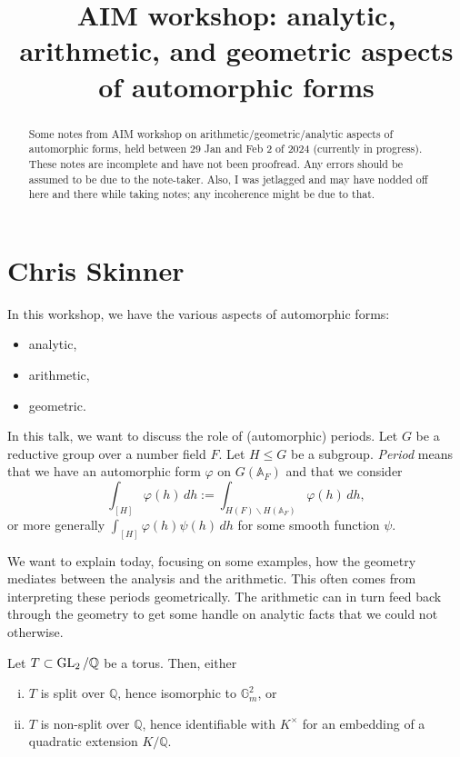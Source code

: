\documentclass[reqno]{amsart} 
\title{AIM workshop: analytic, arithmetic, and geometric aspects of automorphic forms}
\begin{document}
\begin{abstract}
  Some notes from AIM workshop on arithmetic/geometric/analytic aspects of automorphic forms, held between 29 Jan and Feb 2 of 2024 (currently in progress).  These notes are incomplete and have not been proofread.  Any errors should be assumed to be due to the note-taker.  Also, I was jetlagged and may have nodded off here and there while taking notes; any incoherence might be due to that.
\end{abstract}

\maketitle

\section{Chris Skinner}\label{sec:cnfhlpu30h}
In this workshop, we have the various aspects of automorphic forms:
\begin{itemize}
\item analytic,
\item arithmetic,
\item geometric.
\end{itemize}
In this talk, we want to discuss the role of (automorphic) periods.  Let $G$ be a reductive group over a number field $F$.  Let $H \leq G$ be a subgroup. \emph{Period} means that we have an automorphic form $\varphi$ on $G(\mathbb{A}_F)$ and that we consider
\begin{equation*}
  \int_{[H]} \varphi(h) \, d h := \int_{H(F) \backslash H(\mathbb{A}_F)} \varphi(h) \, d h,
\end{equation*}
or more generally $\int_{[H]} \varphi(h) \psi(h) \, d h$ for some smooth function $\psi$.

We want to explain today, focusing on some examples, how the geometry mediates between the analysis and the arithmetic.  This often comes from interpreting these periods geometrically.  The arithmetic can in turn feed back through the geometry to get some handle on analytic facts that we could not otherwise.

Let $T \subset \operatorname{GL}_2 / \mathbb{Q}$ be a torus.  Then, either
\begin{enumerate}[(i)]
\item\label{enumerate:cnej2gipk2} $T$ is split over $\mathbb{Q}$, hence isomorphic to $\mathbb{G}_m^2$, or
\item\label{enumerate:cnej2giqmn} $T$ is non-split over $\mathbb{Q}$, hence identifiable with $K^\times$ for an embedding of a quadratic extension $K /\mathbb{Q}$.
\end{enumerate}
\end{document}
